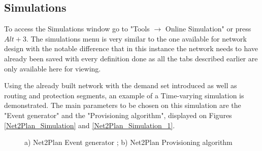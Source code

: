 	
	\newpage
	
	
	\subsection{Simulations}
	To access the Simulations window go to  "Tools $\rightarrow$ Online Simulation" or press $Alt + 3$. The simulations menu is very similar to the one available for network design with the notable difference that in this instance the network needs to have already been saved with every definition done as all the tabs described earlier are only available here for viewing.
	
	Using the already built network with the demand set introduced as well as routing and protection segments, an example of a Time-varying simulation is demonstrated. The main parameters to be chosen on this simulation are the "Event generator" and the "Provisioning algorithm", displayed on Figures \ref{Net2Plan_Simulation} and \ref{Net2Plan_Simulation_1}.
	
	\vspace{-0.3cm}
	
	\begin{figure}[!h]
		\centering
		\caption{a) Net2Plan Event generator ; b) Net2Plan Provisioning algorithm}
	\end{figure}	

